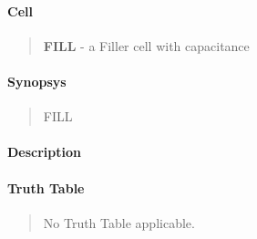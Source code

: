 \label{FILL}
\paragraph{Cell}
\begin{quote}
    \textbf{FILL} - a Filler cell with capacitance
\end{quote}

\paragraph{Synopsys}
\begin{quote}
    FILL
\end{quote}

\paragraph{Description}


\paragraph{Truth Table}
\begin{quote}
No Truth Table applicable.
\end{quote}

